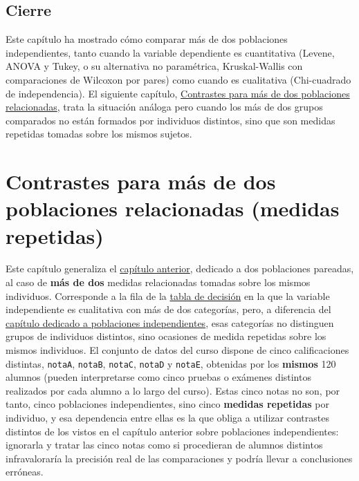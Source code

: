 \documentclass[
  spanish,
  a4paper,
]{scrreport}
\theoremstyle{definition}
\theoremstyle{definition}
\theoremstyle{remark}
\begin{document}
\section{Cierre}\label{cierre}

Este capítulo ha mostrado cómo comparar más de dos poblaciones
independientes, tanto cuando la variable dependiente es cuantitativa
(Levene, ANOVA y Tukey, o su alternativa no paramétrica, Kruskal-Wallis
con comparaciones de Wilcoxon por pares) como cuando es cualitativa
(Chi-cuadrado de independencia). El siguiente capítulo,
\href{15-contrastes-medidas-repetidas.qmd}{Contrastes para más de dos
poblaciones relacionadas}, trata la situación análoga pero cuando los
más de dos grupos comparados no están formados por individuos distintos,
sino que son medidas repetidas tomadas sobre los mismos sujetos.

\chapter{Contrastes para más de dos poblaciones relacionadas (medidas
repetidas)}\label{contrastes-para-muxe1s-de-dos-poblaciones-relacionadas-medidas-repetidas}

Este capítulo generaliza el
\hyperref[contrastes-para-dos-poblaciones-pareadas]{capítulo anterior},
dedicado a dos poblaciones pareadas, al caso de \textbf{más de dos}
medidas relacionadas tomadas sobre los mismos individuos. Corresponde a
la fila de la
\hyperref[selecciuxf3n-del-contraste-estaduxedstico-1]{tabla de
decisión} en la que la variable independiente es cualitativa con más de
dos categorías, pero, a diferencia del
\hyperref[contrastes-para-muxe1s-de-dos-poblaciones-independientes]{capítulo
dedicado a poblaciones independientes}, esas categorías no distinguen
grupos de individuos distintos, sino ocasiones de medida repetidas sobre
los mismos individuos. El conjunto de datos del curso dispone de cinco
calificaciones distintas, \texttt{notaA}, \texttt{notaB},
\texttt{notaC}, \texttt{notaD} y \texttt{notaE}, obtenidas por los
\textbf{mismos} 120 alumnos (pueden interpretarse como cinco pruebas o
exámenes distintos realizados por cada alumno a lo largo del curso).
Estas cinco notas no son, por tanto, cinco poblaciones independientes,
sino cinco \textbf{medidas repetidas} por individuo, y esa dependencia
entre ellas es la que obliga a utilizar contrastes distintos de los
vistos en el capítulo anterior sobre poblaciones independientes:
ignorarla y tratar las cinco notas como si procedieran de alumnos
distintos infravaloraría la precisión real de las comparaciones y podría
llevar a conclusiones erróneas.
\end{document}
